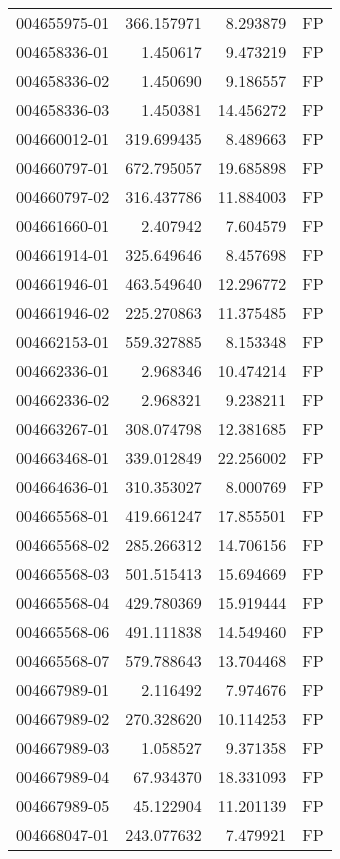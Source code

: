\begin{tabular}{lrrl}
004655975-01 &  366.157971 &     8.293879 &   FP \\
004658336-01 &    1.450617 &     9.473219 &   FP \\
004658336-02 &    1.450690 &     9.186557 &   FP \\
004658336-03 &    1.450381 &    14.456272 &   FP \\
004660012-01 &  319.699435 &     8.489663 &   FP \\
004660797-01 &  672.795057 &    19.685898 &   FP \\
004660797-02 &  316.437786 &    11.884003 &   FP \\
004661660-01 &    2.407942 &     7.604579 &   FP \\
004661914-01 &  325.649646 &     8.457698 &   FP \\
004661946-01 &  463.549640 &    12.296772 &   FP \\
004661946-02 &  225.270863 &    11.375485 &   FP \\
004662153-01 &  559.327885 &     8.153348 &   FP \\
004662336-01 &    2.968346 &    10.474214 &   FP \\
004662336-02 &    2.968321 &     9.238211 &   FP \\
004663267-01 &  308.074798 &    12.381685 &   FP \\
004663468-01 &  339.012849 &    22.256002 &   FP \\
004664636-01 &  310.353027 &     8.000769 &   FP \\
004665568-01 &  419.661247 &    17.855501 &   FP \\
004665568-02 &  285.266312 &    14.706156 &   FP \\
004665568-03 &  501.515413 &    15.694669 &   FP \\
004665568-04 &  429.780369 &    15.919444 &   FP \\
004665568-06 &  491.111838 &    14.549460 &   FP \\
004665568-07 &  579.788643 &    13.704468 &   FP \\
004667989-01 &    2.116492 &     7.974676 &   FP \\
004667989-02 &  270.328620 &    10.114253 &   FP \\
004667989-03 &    1.058527 &     9.371358 &   FP \\
004667989-04 &   67.934370 &    18.331093 &   FP \\
004667989-05 &   45.122904 &    11.201139 &   FP \\
004668047-01 &  243.077632 &     7.479921 &   FP \\

\end{tabular}
